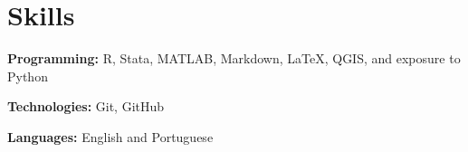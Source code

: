 \documentclass[letterpaper,11pt]{article}
\makeatletter
\newcommand{\resumeItem}[1]{
  \item\small{
    {#1 \vspace{-2pt}}
  }
}
\newcommand{\resumeTeachingHeading}[4]{
	 \vspace{-2pt}\item
	\begin{tabular*}{0.97\textwidth}[t]{l@{\extracolsep{\fill}}r}
		\textbf{#1} & #2 \\
		{#3} & \textit{\small #4} \\
	\end{tabular*}\vspace{-7pt}
}
\newcommand{\resumeProjectHeading}[2]{
    \vspace{-2pt}\item
    \begin{tabular*}{0.97\textwidth}{l@{\extracolsep{\fill}}r}
      \small#1 & #2 \\
    \end{tabular*}\vspace{-7pt}
}
\newcommand{\resumeSubHeadingListStart}{\begin{itemize}[leftmargin=0.15in, label={}]}
\newcommand{\resumeSubHeadingListEnd}{\end{itemize}}
\newcommand{\resumeItemListStart}{\begin{itemize}}
\newcommand{\resumeItemListEnd}{\end{itemize}\vspace{-5pt}}
\makeatother
\begin{document}
      


		




\section{Skills}
  \vspace{2pt}
  \resumeSubHeadingListStart
    \small{\item{
        \textbf{Programming:}{ R, Stata, MATLAB, Markdown, LaTeX, QGIS, and exposure to Python} \\ \vspace{3pt}
        
        \textbf{Technologies:}{ Git, GitHub} \\ \vspace{3pt}

        
        \textbf{Languages:}{ English and Portuguese}
        
    }}
  \resumeSubHeadingListEnd
\end{document}
